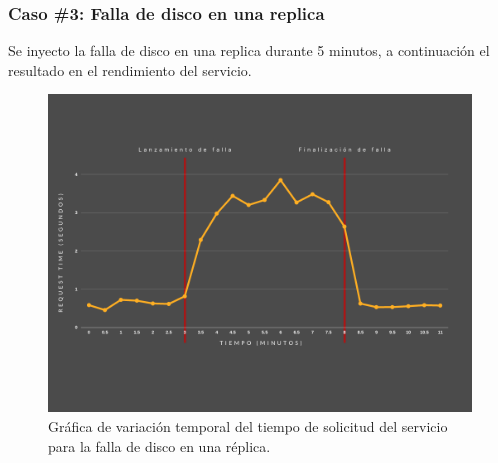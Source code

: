 \subsubsection{Caso \#3: Falla de disco en una replica}

\par Se inyecto la falla de disco en una replica durante 5 minutos, a continuación el resultado en el rendimiento del servicio.\\

\begin{figure}[htpb!]
	\centering
	\includegraphics[width=0.95\columnwidth]{images/graficasexperimentos/Disco1.png}
	\caption{Gráfica de variación temporal del tiempo de solicitud del servicio para la falla de disco en una r\'eplica.}
	\label{fig:disco01}
\end{figure}



